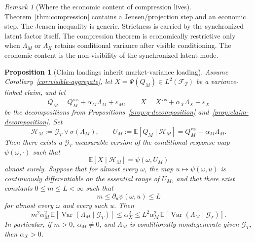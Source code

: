 \documentclass[11pt,a4paper]{amsart}
\theoremstyle{plain}
\newtheorem{proposition}[theorem]{Proposition}
\theoremstyle{definition}
\theoremstyle{remark}
\newtheorem{remark}[theorem]{Remark}
\DeclareMathOperator{\Var}{Var}
\newcommand{\EE}{\mathbb{E}}
\newcommand{\cH}{\mathcal{H}}
\newcommand{\cF}{\mathcal{F}}
\newcommand{\cG}{\mathcal{G}}
\begin{document}
\begin{remark}[Where the economic content of compression lives]\label{rem:compression-content}
Theorem~\ref{thm:compression} contains a Jensen/projection step and an economic step.  The Jensen
inequality is generic.  Strictness is carried by the synchronized latent factor itself.  The
compression theorem is economically restrictive only when \(\Lambda_M\) or \(\Lambda_X\) retains
conditional variance after visible conditioning.  The economic content is the non-visibility of the
synchronized latent mode.
\end{remark}

\begin{proposition}[Claim loadings inherit market-variance loading]\label{prop:loading-transfer}
Assume Corollary~\ref{cor:visible-aggregate}, let \(X=\Psi(Q_M)\in L^2(\cF_T)\) be a
variance-linked claim, and let
\[
        Q_M=Q_M^{\mathrm{vis}}+\alpha_M\Lambda_M+\varepsilon_M,
        \qquad
        X=X^{\mathrm{vis}}+\alpha_X\Lambda_X+\varepsilon_X
\]
be the decompositions from Propositions~\ref{prop:q-decomposition}
and~\ref{prop:claim-decomposition}.  Set
\[
        \cH_M:=\cG_T\vee \sigma(\Lambda_M),
        \qquad
        U_M:=\EE[Q_M\mid \cH_M]=Q_M^{\mathrm{vis}}+\alpha_M\Lambda_M.
\]
Then there exists a \(\cG_T\)-measurable version of the conditional response map
\(\psi(\omega,\cdot)\) such that
\[
        \EE[X\mid \cH_M]=\psi(\omega,U_M)
\]
almost surely.  Suppose that for almost every \(\omega\), the map \(u\mapsto\psi(\omega,u)\) is
continuously differentiable on the essential range of \(U_M\), and that there exist constants
\(0\le m\le L<\infty\) such that
\[
        m
        \le
        \partial_u\psi(\omega,u)
        \le
        L
\]
for almost every \(\omega\) and every such \(u\).  Then
\[
        m^2\alpha_M^2\,\EE[\Var(\Lambda_M\mid \cG_T)]
        \le
        \alpha_X^2
        \le
        L^2\alpha_M^2\,\EE[\Var(\Lambda_M\mid \cG_T)].
\]
In particular, if \(m>0\), \(\alpha_M\neq0\), and \(\Lambda_M\) is conditionally nondegenerate given
\(\cG_T\), then \(\alpha_X>0\).
\end{proposition}
\end{document}
